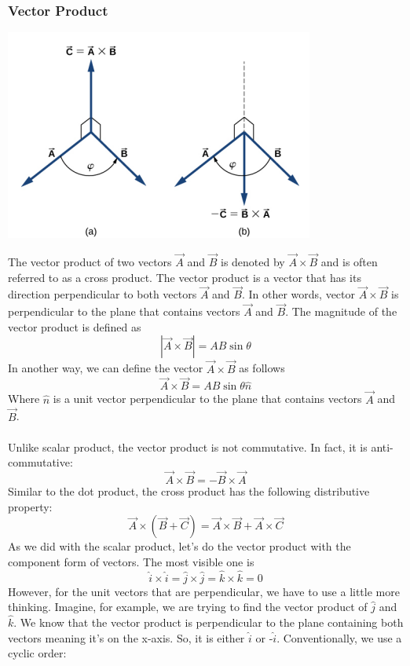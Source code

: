 \documentclass[12pt,addpoints]{exam}
\begin{document}
	\subsubsection*{Vector Product}
	\begin{center}
		\includegraphics[scale=0.5]{cross.png}
	\end{center}
	 The vector product of two vectors $\vec{A}$ and $\vec{B}$ is denoted by $\vec{A}\times\vec{B}$ and is often referred to as a cross product. The vector product is a vector that has its direction perpendicular to both vectors  $\vec{A}$ and $\vec{B}$. In other words, vector $\vec{A}\times\vec{B}$ is perpendicular to the plane that contains vectors $\vec{A}$ and $\vec{B}$. The magnitude of the vector product is defined as
	 $$|\vec{A} \times \vec{B}| = AB \sin \theta$$
	 In another way, we can define the vector $\vec{A}\times\vec{B}$ as follows
	 $$\vec{A}\times\vec{B}=AB \sin \theta \hat{n}$$
	 Where $\hat{n}$ is a unit vector perpendicular to the plane that contains vectors $\vec{A}$ and $\vec{B}$. \\ \\
	 Unlike scalar product, the vector product is not commutative. In fact, it is anti-commutative:
	 $$\vec{A} \times \vec{B} = - \vec{B} \times \vec{A} $$
	 Similar to the dot product, the cross product has the following distributive property:
	 $$\vec{A} \times (\vec{B} + \vec{C}) = \vec{A} \times \vec{B} + \vec{A} \times \vec{C}$$
	 As we did with the scalar product, let's do the vector product with the component form of vectors. The most visible one is
	 $$\hat{i} \times \hat{i} = \hat{j} \times \hat{j} = \hat{k} \times \hat{k} = 0$$
	 However, for the unit vectors that are perpendicular, we have to use a little more thinking. Imagine, for example, we are trying to find the vector product of $\hat{j}$ and $\hat{k}$. We know that the vector product is perpendicular to the plane containing both vectors meaning it's on the x-axis. So, it is either $\hat{i}$ or -$\hat{i}$. Conventionally, we use a cyclic order:
\end{document}
